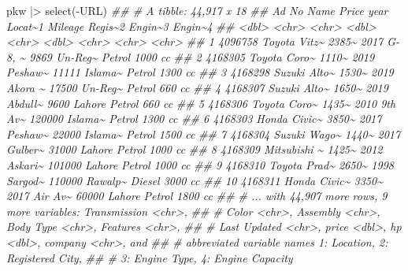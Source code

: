 \documentclass[
  letterpaper,
  DIV=11,
  numbers=noendperiod]{scrartcl}
\newenvironment{Shaded}{\begin{snugshade}}{\end{snugshade}}
\newcommand{\DocumentationTok}[1]{\textcolor[rgb]{0.37,0.37,0.37}{\textit{#1}}}
\newcommand{\FunctionTok}[1]{\textcolor[rgb]{0.28,0.35,0.67}{#1}}
\newcommand{\NormalTok}[1]{\textcolor[rgb]{0.00,0.23,0.31}{#1}}
\newcommand{\SpecialCharTok}[1]{\textcolor[rgb]{0.37,0.37,0.37}{#1}}
\begin{document}
\begin{Shaded}
\begin{Highlighting}[]
\NormalTok{pkw }\SpecialCharTok{|\textgreater{}} \FunctionTok{select}\NormalTok{(}\SpecialCharTok{{-}}\NormalTok{URL)}
\DocumentationTok{\#\# \# A tibble: 44,917 x 18}
\DocumentationTok{\#\#    \textasciigrave{}Ad No\textasciigrave{} Name         Price  year Locat\textasciitilde{}1 Mileage Regis\textasciitilde{}2 Engin\textasciitilde{}3 Engin\textasciitilde{}4}
\DocumentationTok{\#\#      \textless{}dbl\textgreater{} \textless{}chr\textgreater{}        \textless{}chr\textgreater{} \textless{}dbl\textgreater{} \textless{}chr\textgreater{}     \textless{}dbl\textgreater{} \textless{}chr\textgreater{}   \textless{}chr\textgreater{}   \textless{}chr\textgreater{}  }
\DocumentationTok{\#\#  1 4096758 Toyota Vitz\textasciitilde{} 2385\textasciitilde{}  2017 G{-} 8, \textasciitilde{}    9869 Un{-}Reg\textasciitilde{} Petrol  1000 cc}
\DocumentationTok{\#\#  2 4168305 Toyota Coro\textasciitilde{} 1110\textasciitilde{}  2019 Peshaw\textasciitilde{}   11111 Islama\textasciitilde{} Petrol  1300 cc}
\DocumentationTok{\#\#  3 4168298 Suzuki Alto\textasciitilde{} 1530\textasciitilde{}  2019 Akora \textasciitilde{}   17500 Un{-}Reg\textasciitilde{} Petrol  660 cc }
\DocumentationTok{\#\#  4 4168307 Suzuki Alto\textasciitilde{} 1650\textasciitilde{}  2019 Abdull\textasciitilde{}    9600 Lahore  Petrol  660 cc }
\DocumentationTok{\#\#  5 4168306 Toyota Coro\textasciitilde{} 1435\textasciitilde{}  2010 9th Av\textasciitilde{}  120000 Islama\textasciitilde{} Petrol  1300 cc}
\DocumentationTok{\#\#  6 4168303 Honda Civic\textasciitilde{} 3850\textasciitilde{}  2017 Peshaw\textasciitilde{}   22000 Islama\textasciitilde{} Petrol  1500 cc}
\DocumentationTok{\#\#  7 4168304 Suzuki Wago\textasciitilde{} 1440\textasciitilde{}  2017 Gulber\textasciitilde{}   31000 Lahore  Petrol  1000 cc}
\DocumentationTok{\#\#  8 4168309 Mitsubishi \textasciitilde{} 1425\textasciitilde{}  2012 Askari\textasciitilde{}  101000 Lahore  Petrol  1000 cc}
\DocumentationTok{\#\#  9 4168310 Toyota Prad\textasciitilde{} 2650\textasciitilde{}  1998 Sargod\textasciitilde{}  110000 Rawalp\textasciitilde{} Diesel  3000 cc}
\DocumentationTok{\#\# 10 4168311 Honda Civic\textasciitilde{} 3350\textasciitilde{}  2017 Air Av\textasciitilde{}   60000 Lahore  Petrol  1800 cc}
\DocumentationTok{\#\# \# ... with 44,907 more rows, 9 more variables: Transmission \textless{}chr\textgreater{},}
\DocumentationTok{\#\# \#   Color \textless{}chr\textgreater{}, Assembly \textless{}chr\textgreater{}, \textasciigrave{}Body Type\textasciigrave{} \textless{}chr\textgreater{}, Features \textless{}chr\textgreater{},}
\DocumentationTok{\#\# \#   \textasciigrave{}Last Updated\textasciigrave{} \textless{}chr\textgreater{}, price \textless{}dbl\textgreater{}, hp \textless{}dbl\textgreater{}, company \textless{}chr\textgreater{}, and}
\DocumentationTok{\#\# \#   abbreviated variable names 1: Location, 2: \textasciigrave{}Registered City\textasciigrave{},}
\DocumentationTok{\#\# \#   3: \textasciigrave{}Engine Type\textasciigrave{}, 4: \textasciigrave{}Engine Capacity\textasciigrave{}}
\end{Highlighting}
\end{Shaded}
\end{document}
